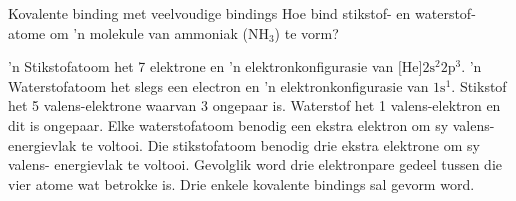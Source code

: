     \noindent
\par 
\begin{wex}{Kovalente binding met veelvoudige bindings }{
Hoe bind stikstof- en waterstof- atome om  'n molekule van ammoniak ($\text{NH}{}_{3}$) te vorm? 
}
{
 'n Stikstofatoom  het 7 elektrone en 'n elektronkonfigurasie van $\text{[He]}2\text{s}^{2}2\text{p}^{3}$.  'n Waterstofatoom het slegs een electron en   'n elektronkonfigurasie van $1\text{s}^{1}$.
Stikstof het 5 valens-elektrone waarvan 3 ongepaar is. Waterstof het 1 valens-elektron en dit is ongepaar.
Elke waterstofatoom benodig een ekstra elektron om sy valens-energievlak te voltooi. Die stikstofatoom benodig drie ekstra elektrone om sy valens- energievlak te voltooi. Gevolglik word drie elektronpare gedeel tussen die vier atome wat betrokke is. Drie enkele kovalente bindings sal gevorm word. 
    \setcounter{subfigure}{0}
\begin{figure}[H]
\end{figure}
 
}
\end{wex}
